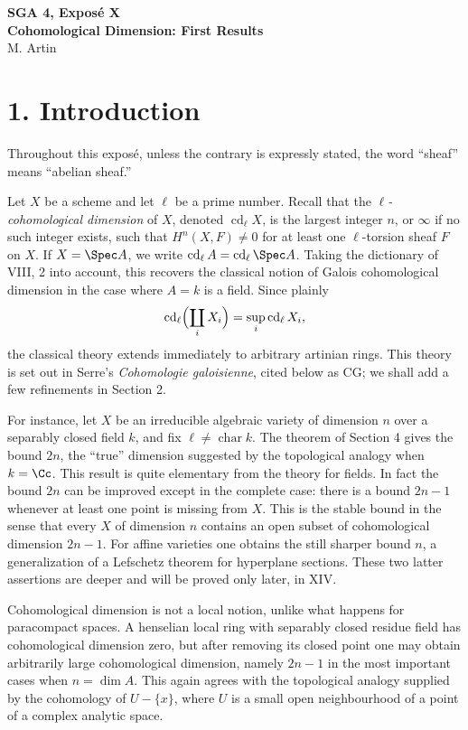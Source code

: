 
\clearpage
\begin{center}
{\Large \textbf{SGA 4, Expos\'e X}}\\[0.35em]
{\large \textbf{Cohomological Dimension: First Results}}\\[0.25em]
{\normalsize M. Artin}
\end{center}

\bigskip

\section*{1. Introduction}
Throughout this expos\'e, unless the contrary is expressly stated, the word ``sheaf'' means ``abelian sheaf.''

Let \(X\) be a scheme and let \(\ell\) be a prime number. Recall that the \emph{\(\ell\)-cohomological dimension} of \(X\), denoted \(\operatorname{cd}_\ell X\), is the largest integer \(n\), or \(\infty\) if no such integer exists, such that \(H^n(X,F)\ne0\) for at least one \(\ell\)-torsion sheaf \(F\) on \(X\). If \(X=\Spec A\), we write \(\operatorname{cd}_\ell A=\operatorname{cd}_\ell\Spec A\). Taking the dictionary of VIII, 2 into account, this recovers the classical notion of Galois cohomological dimension in the case where \(A=k\) is a field. Since plainly
\[
\operatorname{cd}_\ell\Bigl(\coprod_iX_i\Bigr)=\sup_i\operatorname{cd}_\ell X_i,
\]
the classical theory extends immediately to arbitrary artinian rings. This theory is set out in Serre's \emph{Cohomologie galoisienne}, cited below as CG; we shall add a few refinements in Section 2.

For instance, let \(X\) be an irreducible algebraic variety of dimension \(n\) over a separably closed field \(k\), and fix \(\ell\ne\operatorname{char}k\). The theorem of Section 4 gives the bound \(2n\), the ``true'' dimension suggested by the topological analogy when \(k=\Cc\). This result is quite elementary from the theory for fields. In fact the bound \(2n\) can be improved except in the complete case: there is a bound \(2n-1\) whenever at least one point is missing from \(X\). This is the stable bound in the sense that every \(X\) of dimension \(n\) contains an open subset of cohomological dimension \(2n-1\). For affine varieties one obtains the still sharper bound \(n\), a generalization of a Lefschetz theorem for hyperplane sections. These two latter assertions are deeper and will be proved only later, in XIV.

Cohomological dimension is not a local notion, unlike what happens for paracompact spaces. A henselian local ring with separably closed residue field has cohomological dimension zero, but after removing its closed point one may obtain arbitrarily large cohomological dimension, namely \(2n-1\) in the most important cases when \(n=\dim A\). This again agrees with the topological analogy supplied by the cohomology of \(U-\{x\}\), where \(U\) is a small open neighbourhood of a point of a complex analytic space.

